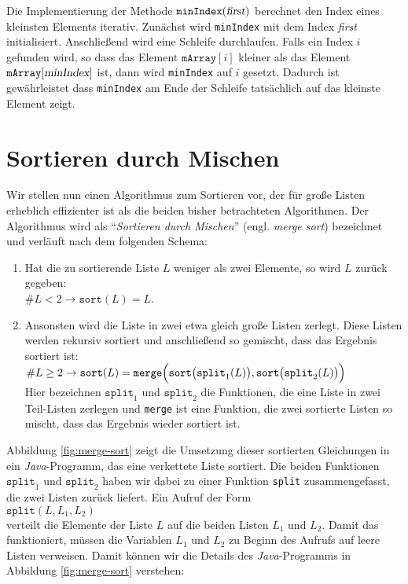 Die Implementierung der Methode $\texttt{minIndex}(\textsl{first})$ berechnet den Index eines kleinsten
Elements iterativ.  Zun\"achst wird \texttt{minIndex} mit dem Index \textsl{first}
initialisiert.  Anschlie{\ss}end wird eine Schleife durchlaufen.  Falls ein
Index $i$ gefunden wird, so dass das Element $\mathtt{mArray}[i]$ kleiner als das Element
$\texttt{mArray}[\textsl{minIndex}]$ ist, dann wird \texttt{minIndex} auf $i$ gesetzt.
Dadurch ist gew\"ahrleistet dass \texttt{minIndex} am Ende der Schleife tats\"achlich auf das
kleinste Element zeigt.
\pagebreak

\section{Sortieren durch Mischen}
Wir stellen nun einen Algorithmus zum Sortieren vor, der f\"ur gro{\ss}e Listen erheblich
effizienter ist als die beiden bisher betrachteten Algorithmen.  Der Algorithmus wird als
``\emph{Sortieren durch Mischen}'' (engl. \emph{merge sort}) bezeichnet und verl\"auft nach dem folgenden Schema:
\begin{enumerate}
\item Hat die zu sortierende Liste $L$ weniger als zwei Elemente, so wird $L$ zur\"uck
      gegeben: \\[0.1cm]
      \hspace*{1.3cm} $\#L < 2 \rightarrow \mathtt{sort}(L) = L$.
\item Ansonsten wird die Liste in zwei etwa gleich gro{\ss}e Listen zerlegt.
      Diese Listen werden rekursiv sortiert und anschlie{\ss}end so gemischt, dass
      das Ergebnis sortiert ist: \\[0.1cm]
      \hspace*{1.3cm} 
 $\#L \geq 2 \rightarrow \mathtt{sort}(L) = \mathtt{merge}\Bigl(\mathtt{sort}\bigl(\mathtt{split}_1(L)\bigr), \mathtt{sort}\bigl(\mathtt{split}_2(L)\bigr)\Bigr)$
     \\[0.1cm]
     Hier bezeichnen $\texttt{split}_1$ und $\mathtt{split}_2$ die Funktionen, die eine Liste in zwei Teil-Listen zerlegen
     und \texttt{merge} ist eine Funktion, die zwei sortierte Listen so mischt, dass das Ergebnis wieder sortiert ist.
\end{enumerate}
Abbildung \ref{fig:merge-sort} zeigt die Umsetzung dieser sortierten Gleichungen 
in ein \textsl{Java}-Programm, das eine verkettete Liste sortiert. 
Die beiden Funktionen $\mathtt{split}_1$ und $\mathtt{split}_2$ haben wir dabei
zu einer Funktion \texttt{split} zusammengefasst, die zwei Listen zur\"uck liefert. Ein
Aufruf der Form
\\[0.2cm]
\hspace*{1.3cm}
$\mathtt{split}(L, L_1, L_2)$
\\[0.2cm]
verteilt die Elemente der Liste $L$ auf die beiden Listen $L_1$ und $L_2$.  
Damit das funktioniert, m\"ussen die Variablen $L_1$ und $L_2$ zu Beginn des Aufrufs auf
leere Listen verweisen.  Damit k\"onnen wir die Details des \textsl{Java}-Programms in
Abbildung \ref{fig:merge-sort} verstehen:


